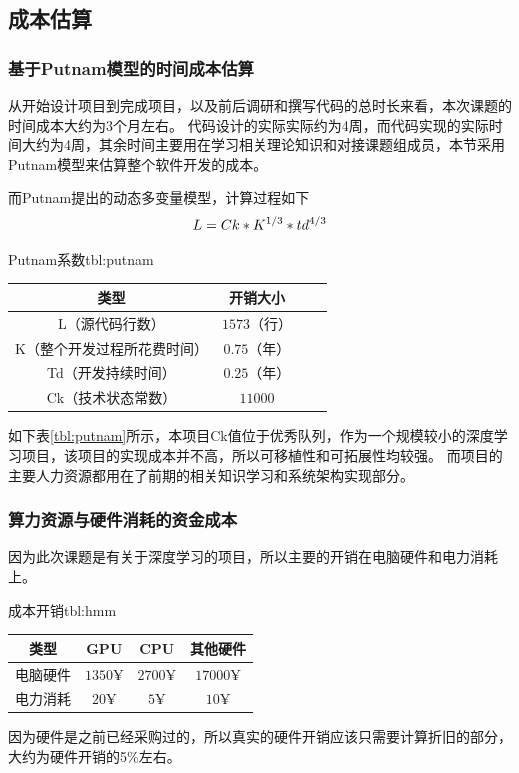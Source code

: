 \documentclass[supercite]{HustGraduPaper}
\theoremstyle{definition}
\begin{document}
\subsection{成本估算}

\subsubsection{基于Putnam模型的时间成本估算}
从开始设计项目到完成项目，以及前后调研和撰写代码的总时长来看，本次课题的时间成本大约为3个月左右。
代码设计的实际实际约为4周，而代码实现的实际时间大约为4周，其余时间主要用在学习相关理论知识和对接课题组成员，本节采用
Putnam模型\cite{王红珍2012软件开发成本估算模型的研究}来估算整个软件开发的成本。

而Putnam提出的动态多变量模型，计算过程如下
\begin{align}
  L = Ck * K^{1/3} * td^{4/3} \notag
\end{align}

\begin{generaltab}{Putnam系数}{tbl:putnam}
  \begin{tabular}{c|ccc}
    \toprule
    类型 & 开销大小 \\
    \midrule
    L（源代码行数） & $1573$（行） \\
    K（整个开发过程所花费时间） & $0.75$（年）\\
    Td（开发持续时间）& $0.25$（年）\\
    Ck（技术状态常数）& $11000$ \\
    \bottomrule
  \end{tabular}
\end{generaltab}
如下表\ref{tbl:putnam}所示，本项目Ck值位于优秀队列，作为一个规模较小的深度学习项目，该项目的实现成本并不高，所以可移植性和可拓展性均较强。
而项目的主要人力资源都用在了前期的相关知识学习和系统架构实现部分。

\subsubsection{算力资源与硬件消耗的资金成本}
因为此次课题是有关于深度学习的项目，所以主要的开销在电脑硬件和电力消耗上。
\begin{generaltab}{成本开销}{tbl:hmm}
  \begin{tabular}{c|ccc}
    \toprule
    类型 & GPU & CPU & 其他硬件 \\
    \midrule
    电脑硬件 & $1350¥$ & $2700¥$ & $17000¥$ \\
    电力消耗 & $20¥$ & $5¥$ & $10¥$ \\
    \bottomrule
  \end{tabular}
\end{generaltab}
因为硬件是之前已经采购过的，所以真实的硬件开销应该只需要计算折旧的部分，大约为硬件开销的5\%左右。
\end{document}
